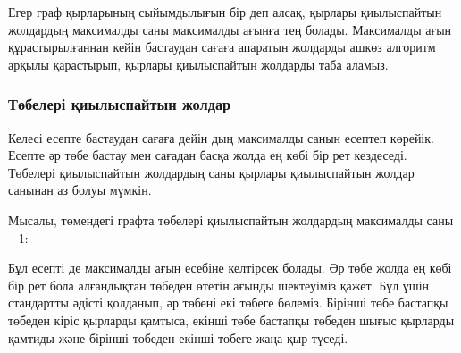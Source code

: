 Егер граф қырларының сыйымдылығын бір деп алсақ,
қырлары қиылыспайтын жолдардың максималды саны
максималды ағынға тең болады. Максималды ағын құрастырылғаннан кейін
бастаудан сағаға апаратын 
жолдарды ашкөз алгоритм арқылы қарастырып,
қырлары қиылыспайтын жолдарды таба аламыз.

\subsubsection{Төбелері қиылыспайтын жолдар}

Келесі есепте
бастаудан сағаға дейін дың максималды санын есептеп көрейік. 
Есепте әр төбе бастау мен сағадан басқа 
жолда ең көбі бір рет кездеседі. 
Төбелері қиылыспайтын жолдардың саны
қырлары қиылыспайтын жолдар санынан 
аз болуы мүмкін. 

Мысалы, төмендегі графта төбелері қиылыспайтын 
жолдардың максималды саны -- 1:

\begin{center}
\end{center}

Бұл есепті де максималды ағын есебіне келтірсек болады. 
Әр төбе жолда ең көбі бір рет бола алғандықтан
төбеден өтетін ағынды шектеуіміз қажет. Бұл үшін стандартты әдісті қолданып,
әр төбені екі төбеге бөлеміз. Бірінші төбе бастапқы төбеден кіріс қырларды қамтыса,
екінші төбе бастапқы төбеден шығыс қырларды қамтиды және бірінші төбеден
екінші төбеге жаңа қыр түседі. 


